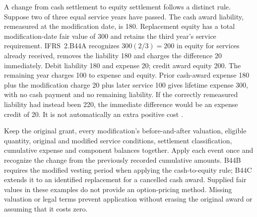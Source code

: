 A change from cash settlement to equity settlement follows a distinct rule.
Suppose two of three equal service years have passed. The cash award liability,
remeasured at the modification date, is 180. Replacement equity has a total
modification-date fair value of 300 and retains the third year's service
requirement. IFRS~2.B44A recognizes $300(2/3)=200$ in equity for services
already received, removes the liability 180 and charges the difference 20
immediately. Debit liability 180 and expense 20; credit award equity 200.
The remaining year charges 100 to expense and equity. Prior cash-award expense
180 plus the modification charge 20 plus later service 100 gives lifetime
expense 300, with no cash payment and no remaining liability. If the correctly
remeasured liability had instead been 220, the immediate difference would be
an expense credit of 20. It is not automatically an extra positive cost
\citep[IFRS~2.B44A--B44C]{eu20231803}.

Keep the original grant, every modification's before-and-after valuation,
eligible quantity, original and modified service conditions, settlement
classification, cumulative expense and component balances together. Apply
each event once and recognize the change from the previously recorded
cumulative amounts. B44B requires the modified vesting period when applying
the cash-to-equity rule; B44C extends it to an identified replacement for a
cancelled cash award. Supplied fair values in these examples do not provide
an option-pricing method. Missing valuation or legal terms prevent application
without erasing the original award or assuming that it costs zero.
